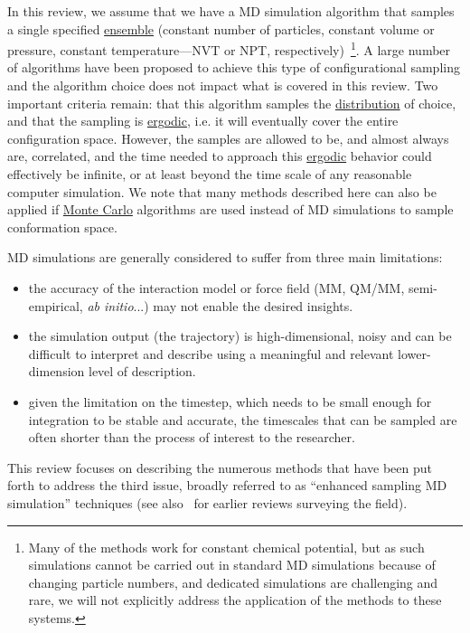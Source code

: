 \documentclass[9pt,review]{livecoms}
\begin{document}
In this review, we assume that we have a MD simulation algorithm that samples a single specified \hyperlink{ref:Ensemble} {ensemble} (constant number of particles, constant volume or pressure, constant temperature---NVT or NPT, respectively)~\footnote{Many of the methods work for constant chemical potential, but as such simulations cannot be carried out in standard MD simulations because of changing particle numbers, and dedicated simulations are challenging and rare, we will not explicitly address the application of the methods to these systems.}. A large number of algorithms have been proposed to achieve this type of configurational sampling and the algorithm choice does not impact what is covered in this review. Two important criteria remain: that this algorithm samples the \hyperlink{ref:Distribution} {distribution} of choice, and that the sampling is \hyperlink{ref:ergodic} {ergodic}, i.e. it will eventually cover the entire configuration space. However, the samples are allowed to be, and almost always are, correlated, and the time needed to approach this \hyperlink{ref:ergodic} {ergodic} behavior could effectively be infinite, or at least beyond the time scale of any reasonable computer simulation. We note that many methods described here can also be applied if \hyperlink{ref:MetropolisMonteCarlo} {Monte Carlo} algorithms are used instead of MD simulations to sample conformation space.

MD simulations are generally considered to suffer from three main limitations:
\begin{itemize}
    \item the accuracy of the interaction model or force field (MM, QM/MM, semi-empirical, \emph{ab initio}...) may not enable the desired insights.
    \item the simulation output (the trajectory) is high-dimensional, noisy and can be difficult to interpret and describe using a meaningful and relevant lower-dimension level of description.
    \item given the limitation on the timestep, which needs to be small enough for integration to be stable and accurate, the timescales that can be sampled are often shorter than the process of interest to the researcher.
\end{itemize}

This review focuses on describing the numerous methods that have been put forth to address the third issue, broadly referred to as ``enhanced sampling MD simulation'' techniques (see also~\cite{10.1016/j.bbagen.2014.10.019,10.1063/1.5109531,10.1039/d1cp04809k} for earlier reviews surveying the field). 
\end{document}
